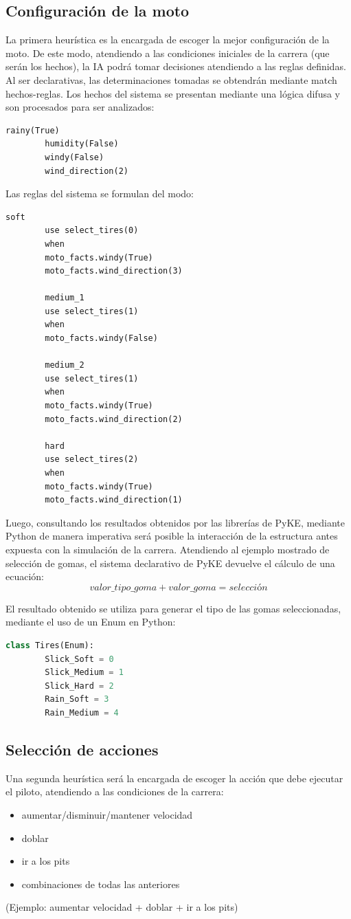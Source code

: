 \documentclass[12pt, letterpaper,spanish]{article}
\theoremstyle{definition}
\theoremstyle{remark}
\begin{document}
	\subsection{Configuración de la moto}
	La primera heurística es la encargada de escoger la mejor configuración de la moto. De este modo, atendiendo a las condiciones iniciales de la carrera (que serán los hechos), la IA podrá tomar decisiones atendiendo a las reglas definidas. Al ser declarativas, las determinaciones tomadas se obtendrán mediante match hechos-reglas.
	Los hechos del sistema se presentan mediante una lógica difusa y son procesados para ser analizados:
	\begin{lstlisting}[language={PySharp}, label={Script}]
		rainy(True)
		humidity(False)
		windy(False)
		wind_direction(2)
	\end{lstlisting}
	
	Las reglas del sistema se formulan del modo:
	\begin{lstlisting}[language={PySharp}, label={Script}]
		soft
		use select_tires(0)
		when
		moto_facts.windy(True)
		moto_facts.wind_direction(3)
		
		medium_1
		use select_tires(1)
		when
		moto_facts.windy(False)
		
		medium_2
		use select_tires(1)
		when
		moto_facts.windy(True)
		moto_facts.wind_direction(2)
		
		hard
		use select_tires(2)
		when
		moto_facts.windy(True)
		moto_facts.wind_direction(1)
	\end{lstlisting}
	
	Luego, consultando los resultados obtenidos por las librerías de PyKE\cite{pyke}, mediante Python de manera imperativa será posible la interacción de la estructura antes expuesta con la simulación de la carrera.
	Atendiendo al ejemplo mostrado de selección de gomas, el sistema declarativo de PyKE\cite{pyke} devuelve el cálculo de una ecuación:
	$$valor\_tipo\_goma + valor\_goma = selección$$
	
	El resultado obtenido se utiliza para generar el tipo de las gomas seleccionadas, mediante el uso de un Enum en Python:
	\begin{lstlisting}[language={Python}, label={Script}]
		class Tires(Enum):
		Slick_Soft = 0
		Slick_Medium = 1
		Slick_Hard = 2
		Rain_Soft = 3
		Rain_Medium = 4
	\end{lstlisting}
	
	\subsection{Selección de acciones}
	Una segunda heurística será la encargada de escoger la acción que debe ejecutar el piloto, atendiendo a las condiciones de la carrera:
	\begin{itemize}
		\item aumentar/disminuir/mantener velocidad
		\item doblar
		\item ir a los pits
		\item combinaciones de todas las anteriores
	\end{itemize}
	(Ejemplo: aumentar velocidad + doblar + ir a los pits)
	
\end{document}
